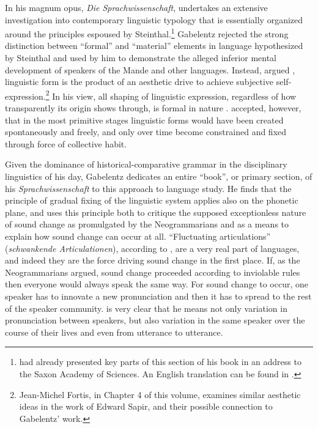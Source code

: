 \documentclass[output=paper]{langscibook}
\begin{document}
In his magnum opus, \emph{Die Sprachwissenschaft}, \citet[341--384]{Gabelentz20161891} undertakes an extensive investigation into contemporary linguistic typology that is essentially organized around the principles espoused by Steinthal.\footnote{\citet{Gabelentz1889} had already presented key parts of this section of his book in an address to the Saxon Academy of Sciences. An English translation can be found in \citet{McElvenny2019}.} Gabelentz rejected the strong distinction between ``formal'' and ``material'' elements in language hypothesized by Steinthal and used by him to demonstrate the alleged inferior mental development of speakers of the Mande and other languages. Instead, argued \citet[380--384]{Gabelentz20161891}, linguistic form is the product of an aesthetic drive to achieve subjective self-expression.\footnote{Jean-Michel Fortis, in Chapter 4 of this volume, examines similar aesthetic ideas in the work of Edward Sapir, and their possible connection to Gabelentz' work.} In his view, all shaping of linguistic expression, regardless of how transparently its origin shows through, is formal in nature \citep[see][]{McElvenny2016}. \citet[406--408]{Gabelentz20161891} accepted, however, that in the most primitive stages linguistic forms would have been created spontaneously and freely, and only over time become constrained and fixed through force of collective habit.

Given the dominance of historical-comparative grammar in the disciplinary linguistics of his day, Gabelentz dedicates an entire ``book'', or primary section, of his \emph{Sprachwissenschaft} to this approach to language study. He finds that the principle of gradual fixing of the linguistic system applies also on the phonetic plane, and uses this principle both to critique the supposed exceptionless nature of sound change as promulgated by the Neogrammarians and as a means to explain how sound change can occur at all. ``Fluctuating articulations'' (\emph{schwankende Articulationen}), according to \citet[196]{Gabelentz20161891}, are a very real part of languages, and indeed they are the force driving sound change in the first place. If, as the Neogrammarians argued, sound change proceeded according to inviolable rules then everyone would always speak the same way. For sound change to occur, one speaker has to innovate a new pronunciation and then it has to spread to the rest of the speaker community. \citet[196--197]{Gabelentz20161891} is very clear that he means not only variation in pronunciation between speakers, but also variation in the same speaker over the course of their lives and even from utterance to utterance.
\end{document}
